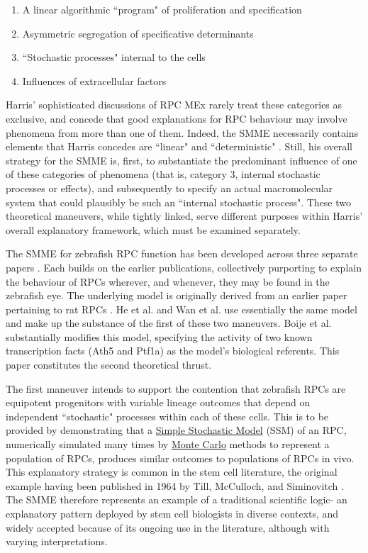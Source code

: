 \begin{enumerate}
\item A linear algorithmic ``program" of proliferation and specification
\item Asymmetric segregation of specificative determinants
\item ``Stochastic processes" internal to the cells
\item Influences of extracellular factors
\end{enumerate}

Harris' sophisticated discussions of RPC MEx rarely treat these categories as exclusive, and concede that good explanations for RPC behaviour may involve phenomena from more than one of them. Indeed, the SMME necessarily contains elements that Harris concedes are ``linear" and ``deterministic" \cite{He2012}. Still, his overall strategy for the SMME is, first, to substantiate the predominant influence of one of these categories of phenomena (that is, category 3, internal stochastic processes or effects), and subsequently to specify an actual macromolecular system that could plausibly be such an ``internal stochastic process". These two theoretical maneuvers, while tightly linked, serve different purposes within Harris' overall explanatory framework, which must be examined separately.

The SMME for zebrafish RPC function has been developed across three separate papers \cite{He2012,Boije2015,Wan2016}. Each builds on the earlier publications, collectively purporting to explain the behaviour of RPCs wherever, and whenever, they may be found in the zebrafish eye. The underlying model is originally derived from an earlier paper pertaining to rat RPCs \cite{Gomes2011}. He et al. \cite{He2012} and Wan et al. \cite{Wan2016} use essentially the same model and make up the substance of the first of these two maneuvers. Boije et al. \cite{Boije2015} substantially modifies this model, specifying the activity of two known transcription facts (Ath5 and Ptf1a) as the model's biological referents. This paper constitutes the second theoretical thrust.

The first maneuver intends to support the contention that zebrafish RPCs are equipotent progenitors with variable lineage outcomes that depend on independent ``stochastic" processes within each of these cells. This is to be provided by demonstrating that a \hyperref[SSM]{Simple Stochastic Model} (SSM) of an RPC, numerically simulated many times by \hyperref[MonteCarlo]{Monte Carlo} methods to represent a population of RPCs, produces similar outcomes to populations of RPCs in vivo. This explanatory strategy is common in the stem cell literature, the original example having been published in 1964 by Till, McCulloch, and Siminovitch \cite{Till1964}. The SMME therefore represents an example of a traditional scientific logic- an explanatory pattern deployed by stem cell biologists in diverse contexts, and widely accepted because of its ongoing use in the literature, although with varying interpretations.

